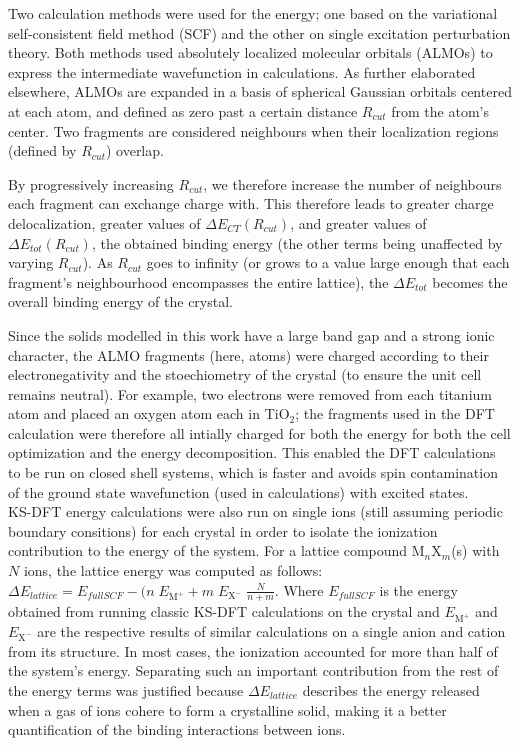 \documentclass[aps,prb,twocolumn,amsmath,amssymb,superscriptaddress,longbibliography]{revtex4-1}
\begin{document}
Two calculation methods were used for the energy; one based on the variational self-consistent field method (SCF) and the other on single excitation perturbation theory\cite{xpt}. Both methods used absolutely localized molecular orbitals (ALMOs) to express the intermediate wavefunction in calculations. As further elaborated elsewhere, ALMOs are expanded in a basis of spherical Gaussian orbitals centered at each atom, and defined as zero past a certain distance $R_{cut}$ from the atom's center. Two fragments are considered neighbours when their localization regions (defined by $R_{cut}$) overlap.

By progressively increasing $R_{cut}$, we therefore increase the number of neighbours each fragment can exchange charge with. This therefore leads to greater charge delocalization, greater values of $\Delta E_{CT}\left(R_{cut}\right)$, and greater values of $\Delta E_{tot}\left(R_{cut}\right)$, the obtained binding energy (the other terms being unaffected by varying $R_{cut}$). As $R_{cut}$ goes to infinity (or grows to a value large enough that each fragment's neighbourhood encompasses the entire lattice), the $\Delta E_{tot}$ becomes the overall binding energy of the crystal.

Since the solids modelled in this work have a large band gap and a strong ionic character, the ALMO fragments (here, atoms) were charged according to their electronegativity and the stoechiometry of the crystal (to ensure the unit cell remains neutral). For example, two electrons were removed from each titanium atom and placed an oxygen atom each in $\text{TiO}_{2}$; the fragments used in the DFT calculation were therefore all intially charged for both the energy for both the cell optimization and the energy decomposition. This enabled the DFT calculations to be run on closed shell systems, which is faster and avoids spin contamination of the ground state wavefunction (used in calculations) with excited states.\\


KS-DFT energy calculations were also run on single ions (still assuming periodic boundary consitions) for each crystal in order to isolate the ionization contribution to the energy of the system. For a lattice compound $\text{M}_{n}\text{X}_{m}$(s) with $N$ ions, the lattice energy was computed as follows: $\Delta E_{lattice} = E_{full SCF} - (n\; E_{\text{M}^{+}} + m\; E_{\text{X}^{-}}\;\frac{N}{n+m}$. Where $E_{full SCF}$ is the energy obtained from running classic KS-DFT calculations on the crystal and $E_{\text{M}^{+}}$ and $E_{\text{X}^{-}}$ are the respective results of similar calculations on a single anion and cation from its structure. In most cases, the ionization accounted for more than half of the system's energy. Separating such an important contribution from the rest of the energy terms was justified because $\Delta E_{lattice}$ describes the energy released when a gas of ions cohere to form a crystalline solid, making it a better quantification of the binding interactions between ions.
\end{document}
